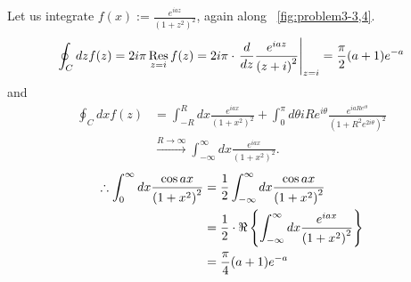 \item

Let us integrate $f(x) := \frac{e^{iaz}}{{\left( 1 + z^2 \right)}^2}$, again along ~\ref{fig:problem3-3,4}.
\begin{align*}
	\oint_C dz f(z)
	= 2i\pi \mathop{\mathrm{Res}}_{z = i} f(z)
	= 2i\pi \cdot {\left. \frac{d}{dz} \frac{e^{iaz}}{{\left( z + i \right)}^2} \right|}_{z = i}
	= \frac{\pi}{2} (a + 1) e^{-a}
\end{align*}
and
\begin{align*}
	\oint_C dx f(z)
	&= \int_{-R}^{R} dx \frac{e^{iax}}{{\left( 1 + x^2 \right)}^2}
	 +\int_0^{\pi} d\theta iRe^{i\theta} \frac{e^{iaRe^{i\theta}}}{{\left( 1 + R^2 e^{2i\theta} \right)}^2} \\
	& \xrightarrow{R \rightarrow \infty} \int_{-\infty}^{\infty} dx \frac{e^{iax}}{{\left( 1 + x^2 \right)}^2}.
\end{align*}
\begin{align*}
	\therefore \int_{0}^{\infty} dx \frac{\cos ax}{{\left( 1 + x^2 \right)}^2}
	&= \frac{1}{2} \int_{-\infty}^{\infty} dx \frac{\cos ax}{{\left( 1 + x^2 \right)}^2} \\
	&= \frac{1}{2} \cdot \Re \left\{ \int_{-\infty}^{\infty} dx \frac{e^{iax}}{{\left( 1 + x^2 \right)}^2} \right\} \\
	&= \frac{\pi}{4} (a + 1) e^{-a}
\end{align*}